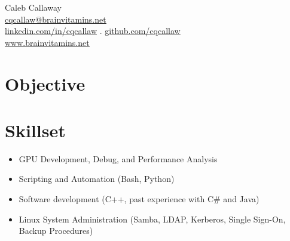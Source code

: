 \documentclass{article}
\begin{document}
	\begin{center}
		{\Large Caleb Callaway}\\
		\href{mailto:cqcallaw@brainvitamins.net}{\uline{cqcallaw@brainvitamins.net}}\\
		\href{http://linkedin.com/in/cqcallaw/}{\uline{linkedin.com/in/cqcallaw}} . \href{https://github.com/cqcallaw/}{\uline{github.com/cqcallaw}}\\
		\href{https://www.brainvitamins.net/}{\uline{www.brainvitamins.net}}
	\end{center}

	\section*{Objective}

	\section*{Skillset}
	\begin{itemize}[label={}]
		\item GPU Development, Debug, and Performance Analysis
		\item Scripting and Automation (Bash, Python)
		\item Software development (C++, past experience with C\# and Java)
		\item Linux System Administration (Samba, LDAP, Kerberos, Single Sign-On, Backup Procedures)
	\end{itemize}
\end{document}
